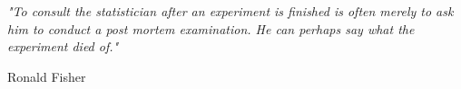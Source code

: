 \textit{"To consult the statistician after an experiment is finished is often merely to ask him to conduct a post mortem examination. He can perhaps say what the experiment died of."}

Ronald Fisher